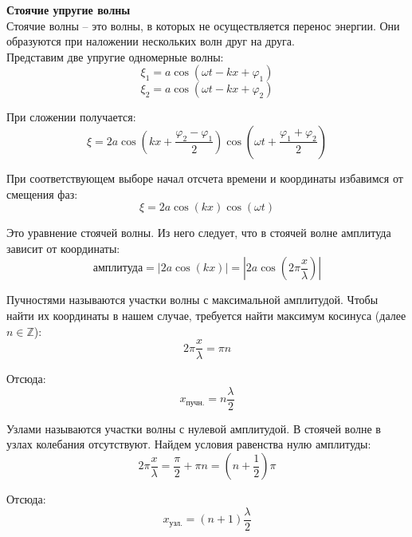 \documentclass{article}
\begin{document}
	
	\textbf{Стоячие упругие волны}\\

	Стоячие волны -- это волны, в которых не осуществляется перенос энергии. Они образуются при наложении нескольких волн друг на друга.\\

	Представим две упругие одномерные волны:
	\begin{equation}
		\xi_1 = a\cos(\omega t - kx + \varphi_1)
	\end{equation}
	\begin{equation}
		\xi_2 = a\cos(\omega t - kx + \varphi_2)
	\end{equation}

	При сложении получается:
	\begin{equation}
		\xi = 2a\cos(kx+\frac{\varphi_2-\varphi_1}{2})\cos(\omega t + \frac{\varphi_1+\varphi_2}{2})
	\end{equation}

	При соответствующем выборе начал отсчета времени и координаты избавимся от смещения фаз:
	\begin{equation}
		\xi = 2a\cos(kx)\cos(\omega t)
	\end{equation}

	Это уравнение стоячей волны. Из него следует, что в стоячей волне амплитуда зависит от координаты:
	\begin{equation}
		\text{амплитуда} = |2a\cos(kx)|=|2a\cos(2\pi\frac{x}{\lambda})|
	\end{equation}

	Пучностями называются участки волны с максимальной амплитудой. Чтобы найти их координаты в нашем случае, требуется найти максимум косинуса (далее $n\in\mathbb{Z}$):
	\begin{equation}
		2\pi\frac{x}{\lambda}=\pi n
	\end{equation}

	Отсюда:
	\begin{equation}
		x_\text{пучн.} = n\frac{\lambda}{2}
	\end{equation}

	Узлами называются участки волны с нулевой амплитудой. В стоячей волне в узлах колебания отсутствуют. Найдем условия равенства нулю амплитуды:
	\begin{equation}
		2\pi\frac{x}{\lambda}=\frac{\pi}{2}+\pi n=(n+\frac{1}{2})\pi
	\end{equation}

	Отсюда:
	\begin{equation}
		x_\text{узл.} = (n+1)\frac{\lambda}{2}
	\end{equation}
\end{document}
